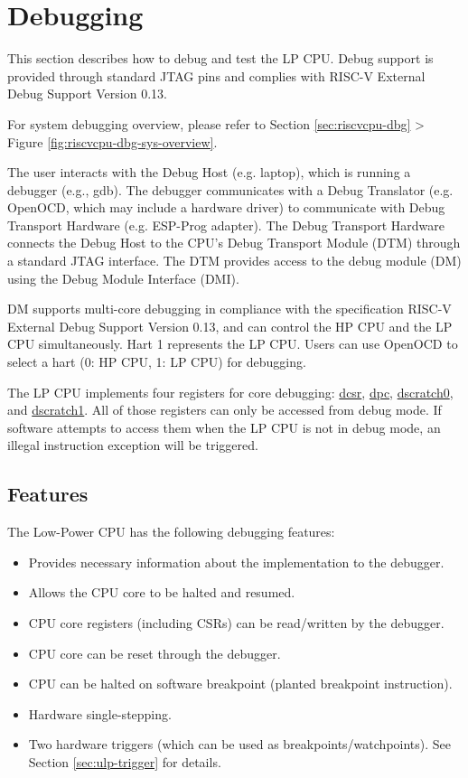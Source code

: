 \documentclass[main\_\_EN.tex]{subfiles}
\begin{document}
\section{Debugging}

This section describes how to debug and test the LP CPU. Debug support is provided through standard JTAG pins and complies with RISC-V External Debug Support Version 0.13.

For \chipname{} system debugging overview, please refer to Section \ref{sec:riscvcpu-dbg} \textit{} > Figure \ref{fig:riscvcpu-dbg-sys-overview}.

The user interacts with the Debug Host (e.g. laptop), which is running a debugger (e.g., gdb). The debugger communicates with a Debug Translator (e.g. OpenOCD, which may include a hardware driver) to communicate with Debug Transport Hardware (e.g. ESP-Prog adapter). The Debug Transport Hardware connects the Debug Host to the CPU’s Debug Transport Module (DTM) through a standard JTAG interface. The DTM provides access to the debug module (DM) using the Debug Module Interface (DMI).

DM supports multi-core debugging in compliance with the specification RISC-V External Debug Support Version 0.13, and can control the HP CPU and the LP CPU simultaneously. Hart 1 represents the LP CPU. Users can use OpenOCD to select a hart (0: HP CPU, 1: LP CPU) for debugging.

The LP CPU implements four registers for core debugging: \hyperref[regdesc:LPDCSR]{dcsr}, \hyperref[regdesc:LPDPC]{dpc}, \hyperref[regdesc:LPDSCRATCH0]{dscratch0}, and \hyperref[regdesc:LPDSCRATCH1]{dscratch1}. All of those registers can only be accessed from debug mode. If software attempts to access them when the LP CPU is not in debug mode, an illegal instruction exception will be triggered.

\subsection{Features}
The Low-Power CPU has the following debugging features:
\begin{itemize}
    \item {Provides necessary information about the implementation to the debugger.}
    \item {Allows the CPU core to be halted and resumed.}
    \item {CPU core registers (including CSRs) can be read/written by the debugger.}
    \item {CPU core can be reset through the debugger.}
    \item {CPU can be halted on software breakpoint (planted breakpoint instruction).}
    \item {Hardware single-stepping.}
    \item {Two hardware triggers (which can be used as breakpoints/watchpoints). See Section \ref{sec:ulp-trigger} for details.}
\end{itemize}
\end{document}

